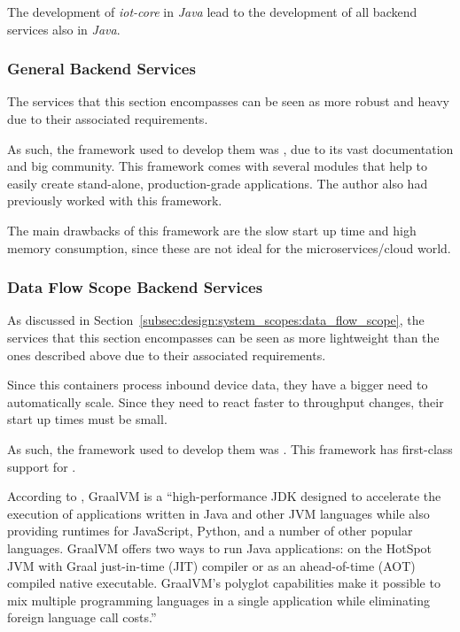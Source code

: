 The development of \textit{iot-core} in \textit{Java} lead to the development of all backend services also in \textit{Java}.

\subsubsection*{General Backend Services}
\label{subsubsec:implementation:decisions:backend:geral}

The services that this section encompasses can be seen as more robust and heavy due to their associated requirements.

As such, the framework used to develop them was , due to its vast documentation and big community. This framework comes with several modules that help to easily create stand-alone, production-grade applications. The author also had previously worked with this framework.

The main drawbacks of this framework are the slow start up time and high memory consumption, since these are not ideal for the microservices/cloud world.

\subsubsection*{Data Flow Scope Backend Services}
\label{subsubsec:implementation:decisions:backend:flow}

As discussed in Section~\ref{subsec:design:system_scopes:data_flow_scope}, the services that this section encompasses can be seen as more lightweight than the ones described above due to their associated requirements.

Since this containers process inbound device data, they have a bigger need to automatically scale. Since they need to react faster to throughput changes, their start up times must be small.

As such, the framework used to develop them was . This framework has first-class support for .

According to \cite{graalvm-intro}, GraalVM is a ``high-performance JDK designed to accelerate the execution of applications written in Java and other JVM languages while also providing runtimes for JavaScript, Python, and a number of other popular languages. GraalVM offers two ways to run Java applications: on the HotSpot JVM with Graal just-in-time (JIT) compiler or as an ahead-of-time (AOT) compiled native executable. GraalVM's polyglot capabilities make it possible to mix multiple programming languages in a single application while eliminating foreign language call costs.''

